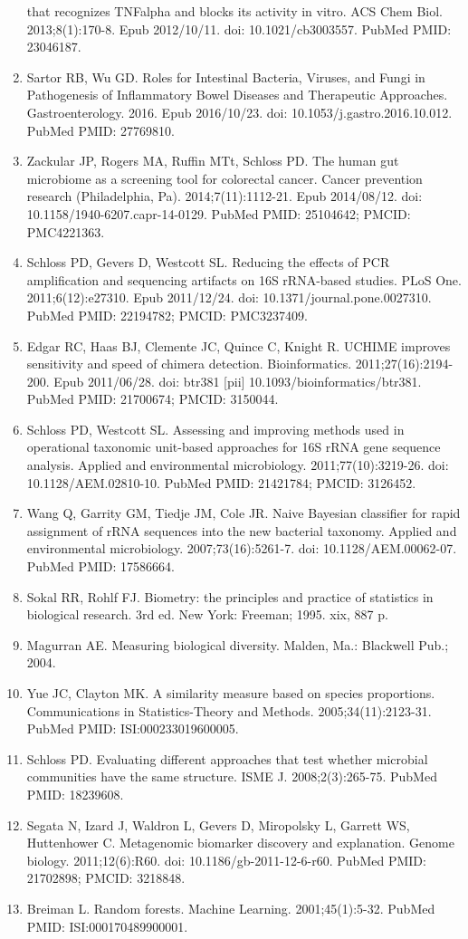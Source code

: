 \documentclass[11pt,]{article}
\begin{document}
\begin{enumerate}
  that recognizes TNFalpha and blocks its activity in vitro. ACS Chem
  Biol. 2013;8(1):170-8. Epub 2012/10/11. doi: 10.1021/cb3003557. PubMed
  PMID: 23046187.
\item
  Sartor RB, Wu GD. Roles for Intestinal Bacteria, Viruses, and Fungi in
  Pathogenesis of Inflammatory Bowel Diseases and Therapeutic
  Approaches. Gastroenterology. 2016. Epub 2016/10/23. doi:
  10.1053/j.gastro.2016.10.012. PubMed PMID: 27769810.
\item
  Zackular JP, Rogers MA, Ruffin MTt, Schloss PD. The human gut
  microbiome as a screening tool for colorectal cancer. Cancer
  prevention research (Philadelphia, Pa). 2014;7(11):1112-21. Epub
  2014/08/12. doi: 10.1158/1940-6207.capr-14-0129. PubMed PMID:
  25104642; PMCID: PMC4221363.
\item
  Schloss PD, Gevers D, Westcott SL. Reducing the effects of PCR
  amplification and sequencing artifacts on 16S rRNA-based studies. PLoS
  One. 2011;6(12):e27310. Epub 2011/12/24. doi:
  10.1371/journal.pone.0027310. PubMed PMID: 22194782; PMCID:
  PMC3237409.
\item
  Edgar RC, Haas BJ, Clemente JC, Quince C, Knight R. UCHIME improves
  sensitivity and speed of chimera detection. Bioinformatics.
  2011;27(16):2194-200. Epub 2011/06/28. doi: btr381 {[}pii{]}
  10.1093/bioinformatics/btr381. PubMed PMID: 21700674; PMCID: 3150044.
\item
  Schloss PD, Westcott SL. Assessing and improving methods used in
  operational taxonomic unit-based approaches for 16S rRNA gene sequence
  analysis. Applied and environmental microbiology. 2011;77(10):3219-26.
  doi: 10.1128/AEM.02810-10. PubMed PMID: 21421784; PMCID: 3126452.
\item
  Wang Q, Garrity GM, Tiedje JM, Cole JR. Naive Bayesian classifier for
  rapid assignment of rRNA sequences into the new bacterial taxonomy.
  Applied and environmental microbiology. 2007;73(16):5261-7. doi:
  10.1128/AEM.00062-07. PubMed PMID: 17586664.
\item
  Sokal RR, Rohlf FJ. Biometry: the principles and practice of
  statistics in biological research. 3rd ed. New York: Freeman; 1995.
  xix, 887 p.
\item
  Magurran AE. Measuring biological diversity. Malden, Ma.: Blackwell
  Pub.; 2004.
\item
  Yue JC, Clayton MK. A similarity measure based on species proportions.
  Communications in Statistics-Theory and Methods. 2005;34(11):2123-31.
  PubMed PMID: ISI:000233019600005.
\item
  Schloss PD. Evaluating different approaches that test whether
  microbial communities have the same structure. ISME J.
  2008;2(3):265-75. PubMed PMID: 18239608.
\item
  Segata N, Izard J, Waldron L, Gevers D, Miropolsky L, Garrett WS,
  Huttenhower C. Metagenomic biomarker discovery and explanation. Genome
  biology. 2011;12(6):R60. doi: 10.1186/gb-2011-12-6-r60. PubMed PMID:
  21702898; PMCID: 3218848.
\item
  Breiman L. Random forests. Machine Learning. 2001;45(1):5-32. PubMed
  PMID: ISI:000170489900001.
\end{enumerate}
\end{document}
